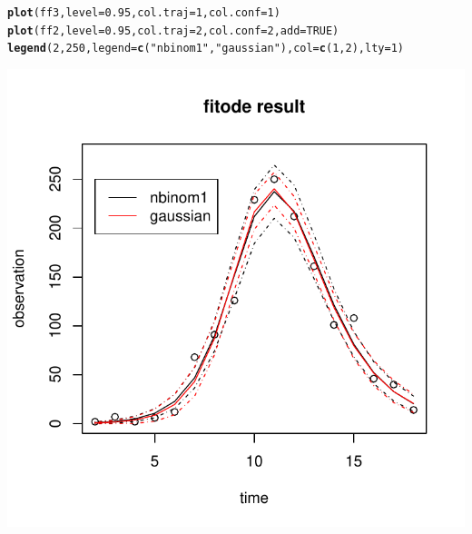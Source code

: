 \documentclass{article}\usepackage[]{graphicx}\usepackage[]{color}
\makeatletter
\def\maxwidth{ %
  \ifdim\Gin@nat@width>\linewidth
    \linewidth
  \else
    \Gin@nat@width
  \fi
}
\newcommand{\hlnum}[1]{\textcolor[rgb]{0.686,0.059,0.569}{#1}}%
\newcommand{\hlstr}[1]{\textcolor[rgb]{0.192,0.494,0.8}{#1}}%
\newcommand{\hlstd}[1]{\textcolor[rgb]{0.345,0.345,0.345}{#1}}%
\newcommand{\hlkwc}[1]{\textcolor[rgb]{0.333,0.667,0.333}{#1}}%
\newcommand{\hlkwd}[1]{\textcolor[rgb]{0.737,0.353,0.396}{\textbf{#1}}}%
\newenvironment{kframe}{%
 \def\at@end@of@kframe{}%
 \ifinner\ifhmode%
  \def\at@end@of@kframe{\end{minipage}}%
  \begin{minipage}{\columnwidth}%
 \fi\fi%
 \def\FrameCommand##1{\hskip\@totalleftmargin \hskip-\fboxsep
 \colorbox{shadecolor}{##1}\hskip-\fboxsep
     \hskip-\linewidth \hskip-\@totalleftmargin \hskip\columnwidth}%
 \MakeFramed {\advance\hsize-\width
   \@totalleftmargin\z@ \linewidth\hsize
   \@setminipage}}%
 {\par\unskip\endMakeFramed%
 \at@end@of@kframe}
\newenvironment{knitrout}{}{} %
\makeatother
\begin{document}
\begin{knitrout}
\color{fgcolor}\begin{kframe}
\begin{alltt}
\hlkwd{plot}\hlstd{(ff3,} \hlkwc{level}\hlstd{=}\hlnum{0.95}\hlstd{,} \hlkwc{col.traj}\hlstd{=}\hlnum{1}\hlstd{,} \hlkwc{col.conf}\hlstd{=}\hlnum{1}\hlstd{)}
\hlkwd{plot}\hlstd{(ff2,} \hlkwc{level}\hlstd{=}\hlnum{0.95}\hlstd{,} \hlkwc{col.traj}\hlstd{=}\hlnum{2}\hlstd{,} \hlkwc{col.conf}\hlstd{=}\hlnum{2}\hlstd{,} \hlkwc{add}\hlstd{=}\hlnum{TRUE}\hlstd{)}
\hlkwd{legend}\hlstd{(}\hlnum{2}\hlstd{,} \hlnum{250}\hlstd{,} \hlkwc{legend}\hlstd{=}\hlkwd{c}\hlstd{(}\hlstr{"nbinom1"}\hlstd{,} \hlstr{"gaussian"}\hlstd{),} \hlkwc{col}\hlstd{=}\hlkwd{c}\hlstd{(}\hlnum{1}\hlstd{,}\hlnum{2}\hlstd{),} \hlkwc{lty}\hlstd{=}\hlnum{1}\hlstd{)}
\end{alltt}
\end{kframe}
\includegraphics[width=\maxwidth]{figure/plot2-1} 

\end{knitrout}
\end{document}
